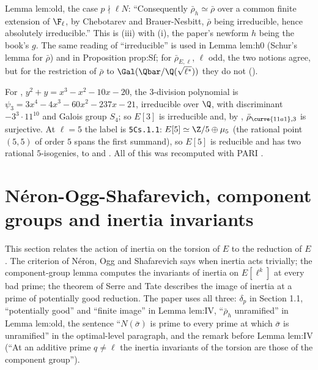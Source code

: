 \begin{paperlink}
Lemma lem:old, the case $p\nmid\ell N$: ``Consequently $\bar\rho_h\simeq\bar\rho$ over a common finite extension of $\F_\ell$, by Chebotarev and
Brauer-Nesbitt, $\bar\rho$ being irreducible, hence absolutely irreducible.'' This is (iii) with (i), the paper's
newform $h$ being the book's $g$. The same
reading of ``irreducible'' is used in Lemma lem:h0 (Schur's lemma for $\bar\rho$) and in Proposition prop:Sf; for $\bar\rho_{E,\ell}$, $\ell$ odd, the two
notions agree, but for the restriction of $\bar\rho$ to $\Gal(\Qbar/\Q(\sqrt{\ell^*}))$ they do not ().
\end{paperlink}

\begin{example}\label{ex:galrep:eleven}
For , $y^2+y=x^3-x^2-10x-20$, the $3$-division polynomial is $\psi_3=3x^4-4x^3-60x^2-237x-21$, irreducible over $\Q$, with discriminant
$-3^3\cdot11^{10}$ and Galois group $S_4$; so $E[3]$ is irreducible and, by , $\bar\rho_{\curve{11a1},3}$ is surjective. At $\ell=5$
the label is \texttt{5Cs.1.1}: $E[5]\simeq\Z/5\oplus\mu_5$ (the rational point $(5,5)$ of order $5$ spans the first summand), so $E[5]$ is reducible
and  has two rational $5$-isogenies, to  and . All of this was recomputed with PARI \cite{PARI}.
\end{example}

\section[N\'eron-Ogg-Shafarevich and inertia invariants]{N\'eron-Ogg-Shafarevich, component groups and inertia invariants}\label{sec:galrep:nos}

This section relates the action of inertia on the torsion of $E$ to the reduction of $E$. The criterion of N\'eron, Ogg and
Shafarevich says when inertia acts trivially; the component-group lemma computes the invariants of inertia on $E[\ell^k]$ at every bad
prime; the theorem of Serre and Tate describes the image of inertia at a prime of potentially good reduction. The paper uses all
three: $\delta_p$ in Section 1.1, ``potentially good'' and ``finite image'' in Lemma lem:IV, ``$\bar\rho_h$ unramified'' in Lemma lem:old, the
sentence ``$N(\bar\sigma)$ is prime to every prime at which $\bar\sigma$ is unramified'' in the optimal-level paragraph, and the remark before
Lemma lem:IV (``At an additive prime $q\ne\ell$ the inertia invariants of the torsion are those of the component group'').

